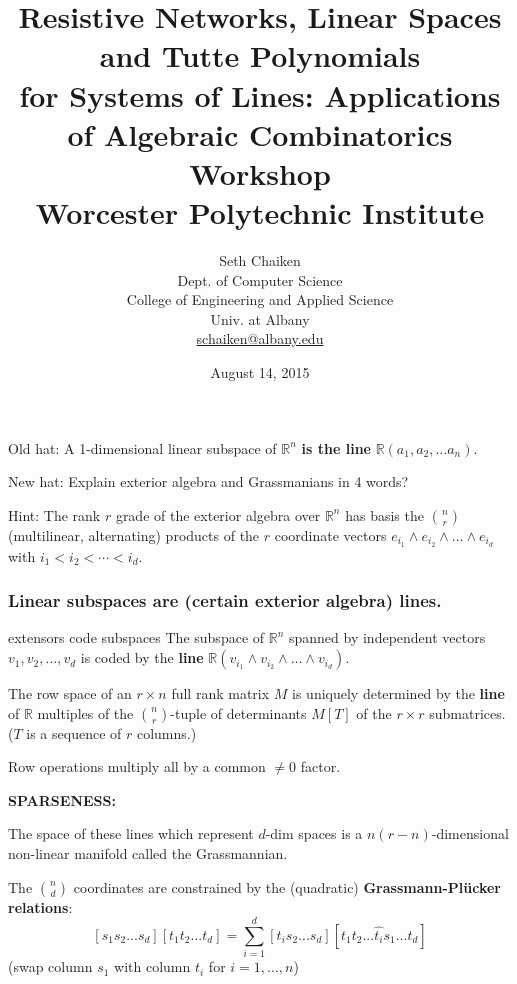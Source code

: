 \documentclass{beamer}
\title{
Resistive Networks, Linear Spaces and Tutte Polynomials\\
for Systems of Lines: Applications of Algebraic Combinatorics Workshop\\
Worcester Polytechnic Institute}
\author{Seth Chaiken\\
Dept. of Computer Science\\
College of Engineering and Applied Science\\
Univ. at Albany\\
\url{schaiken@albany.edu}
}
\date{August 14, 2015}
\newcommand{\Reals}{\ensuremath{\mathbb{R}}}
\begin{document}
\begin{frame}
 \titlepage
\end{frame}




\begin{frame}
Old hat: A 1-dimensional linear subspace of $\Reals^n$ \textbf{is the line} 
$\Reals (a_1, a_2, \ldots a_n)$.

New hat: Explain exterior algebra and Grassmanians in 4 words?


Hint:  The rank $r$ grade of the exterior algebra over $\Reals^n$ has 
basis the $\binom{n}{r}$ (multilinear, alternating) products
of the $r$ coordinate vectors $e_{i_1}\wedge e_{i_2}\wedge \ldots \wedge e_{i_d}$
with $i_1<i_2<\cdots < i_d$.

\end{frame}

\begin{frame}
\frametitle{Linear subspaces are (certain exterior algebra) lines.}

\begin{block}{extensors code subspaces}
The subspace of $\Reals^n$ spanned by independent vectors 
$v_1, v_2, \ldots, v_d$ is coded by the \textbf{line}
$\Reals(v_{i_1}\wedge v_{i_2}\wedge \ldots \wedge v_{i_d})$.
\end{block}

The row space of an $r \times n$ full rank matrix $M$ is uniquely determined by
the \textbf{line} of $\Reals$ multiples of the 
$\binom{n}{r}$-tuple of determinants $M[T]$ 
of the $r\times r$ submatrices.\\
($T$ is a sequence of $r$ columns.)

Row operations multiply all by a common $\neq 0$ factor.

\textbf{SPARSENESS:}

The space of these lines which represent $d$-dim spaces is a
$n(r-n)$-dimensional non-linear manifold called the Grassmannian.

The $\binom{n}{d}$ coordinates are constrained by the (quadratic)
\textbf{Grassmann-Pl\"{u}cker relations}:
\[
[s_1 s_2 ... s_d][t_1 t_2 ... t_d] = 
\sum_{i=1}^d [t_i s_2 ... s_d][t_1 t_2 ... \hat{t_i} s_1 ... t_d]
\]
(swap column $s_1$ with column $t_i$ for $i=1, ..., n$)


\end{frame}
  
\end{document}
